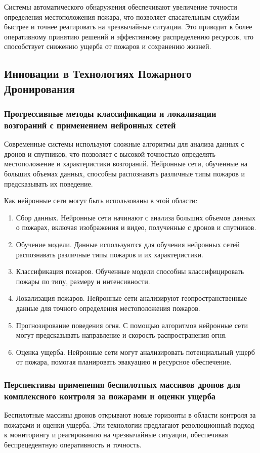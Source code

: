 Системы автоматического обнаружения обеспечивают увеличение точности определения местоположения пожара, что позволяет спасательным службам быстрее и точнее реагировать на чрезвычайные ситуации. Это приводит к более оперативному принятию решений и эффективному распределению ресурсов, что способствует снижению ущерба от пожаров и сохранению жизней.
\subsection{Инновации в Технологиях Пожарного Дронирования}
\subsubsection{Прогрессивные методы классификации и локализации возгораний с применением нейронных сетей}
Современные системы используют сложные алгоритмы для анализа данных с дронов и спутников, что позволяет с высокой точностью определять местоположение и характеристики возгораний. Нейронные сети, обученные на больших объемах данных, способны распознавать различные типы пожаров и предсказывать их поведение.

Как нейронные сети могут быть использованы в этой области:
\begin{enumerate}
	\item Сбор данных. Нейронные сети начинают с анализа больших объемов данных о пожарах, включая изображения и видео, полученные с дронов и спутников.
	\item Обучение модели. Данные используются для обучения нейронных сетей распознавать различные типы пожаров и их характеристики.
	\item Классификация пожаров. Обученные модели способны классифицировать пожары по типу, размеру и интенсивности.
	\item Локализация пожаров. Нейронные сети анализируют геопространственные данные для точного определения местоположения пожаров.
	\item Прогнозирование поведения огня. С помощью алгоритмов нейронные сети могут предсказывать направление и скорость распространения огня.
	\item Оценка ущерба. Нейронные сети могут анализировать потенциальный ущерб от пожара, помогая планировать эвакуацию и ресурсное обеспечение.
\end{enumerate}

\subsubsection{Перспективы применения беспилотных массивов дронов для комплексного контроля за пожарами и оценки ущерба}
Беспилотные массивы дронов открывают новые горизонты в области контроля за пожарами и оценки ущерба. Эти технологии предлагают революционный подход к мониторингу и реагированию на чрезвычайные ситуации, обеспечивая беспрецедентную оперативность и точность.

